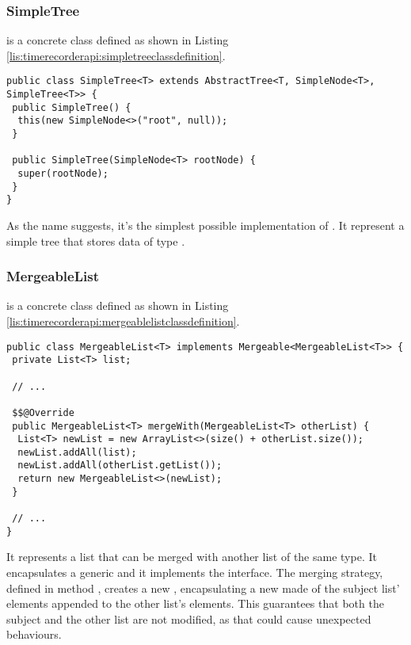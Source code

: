 \subsubsection{SimpleTree}

 is a concrete class defined as shown in Listing \ref{lis:timerecorderapi:simpletreeclassdefinition}.

\begin{lstlisting}[breaklines,caption={SimpleTree class definition},label=lis:timerecorderapi:simpletreeclassdefinition]
public class SimpleTree<T> extends AbstractTree<T, SimpleNode<T>, SimpleTree<T>> {
 public SimpleTree() {
  this(new SimpleNode<>("root", null));
 }

 public SimpleTree(SimpleNode<T> rootNode) {
  super(rootNode);
 }
}
\end{lstlisting}

\noindent As the name suggests, it's the simplest possible implementation of . It represent a simple tree that stores data of type .

\subsubsection{MergeableList}

 is a concrete class defined as shown in Listing \ref{lis:timerecorderapi:mergeablelistclassdefinition}.

\begin{lstlisting}[breaklines,caption={MergeableList class definition},label=lis:timerecorderapi:mergeablelistclassdefinition]
public class MergeableList<T> implements Mergeable<MergeableList<T>> {
 private List<T> list;

 // ...

 $$@Override
 public MergeableList<T> mergeWith(MergeableList<T> otherList) {
  List<T> newList = new ArrayList<>(size() + otherList.size());
  newList.addAll(list);
  newList.addAll(otherList.getList());
  return new MergeableList<>(newList);
 }

 // ...
}
\end{lstlisting}

\noindent It represents a list that can be merged with another list of the same type. It encapsulates a generic  and it implements the  interface. The merging strategy, defined in method , creates a new , encapsulating a new  made of the subject list' elements appended to the other list's elements. This guarantees that both the subject and the other list are not modified, as that could cause unexpected behaviours.

